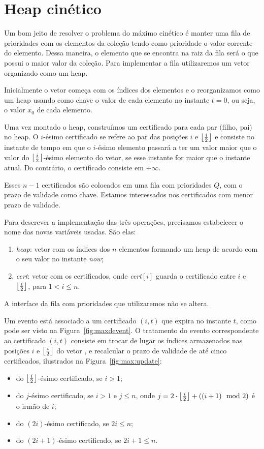 

\section{Heap cinético}\label{sec:heap-cinetico}
Um bom jeito de resolver o problema do máximo cinético é manter uma fila de
prioridades com os elementos da coleção tendo como prioridade o valor corrente
do elemento.
Dessa maneira, o elemento que se encontra na raiz da fila será o que possui o maior valor da
coleção.
Para implementar a fila utilizaremos um vetor organizado como um heap.

Inicialmente o vetor começa com os índices dos elementos e o reorganizamos como um
heap usando como chave o valor de cada elemento no instante $t = 0$, ou seja, o
valor $x_0$ de cada elemento.

Uma vez montado o heap, construímos um certificado para cada par $($filho,
pai$)$ no heap.
O $i$-ésimo certificado se refere ao par das posições $i$ e $\left\lfloor \frac{i}{2} \right\rfloor$ e consiste no
instante de tempo em que o $i$-ésimo elemento passará a ter um valor maior que o valor do
$\left\lfloor \frac{i}{2} \right\rfloor$-ésimo elemento do vetor, se esse instante for maior que o instante atual.
Do contrário, o certificado consiste em $+\infty$.

Esses $n - 1$ certificados são colocados em uma fila com prioridades $Q$, com o
prazo de validade como chave.
Estamos interessados nos certificados com menor prazo de validade.

Para descrever a implementação das três operações, precisamos estabelecer o nome
das novas variáveis usadas.
São elas:
\begin{enumerate}
    \item \textit{heap}: vetor com os índices dos $n$ elementos
    formando um heap de acordo com o seu valor no instante
    \textit{now};
    \item \textit{cert}: vetor com os certificados, onde
    \textit{cert}$[i]$ guarda o certificado entre $i$ e
    $\left\lfloor \frac{i}{2} \right\rfloor$, para $1 < i \leq n$.
\end{enumerate}

A interface da fila com prioridades que utilizaremos não se altera.

Um evento está associado a um certificado $(i, t)$ que expira no instante $t$,
como pode ser visto na Figura~\ref{fig:maxdevent}.
O tratamento do evento correspondente ao certificado $(i, t)$ consiste em trocar de lugar os
índices armazenados nas posições $i$ e $\left\lfloor \frac{i}{2} \right\rfloor$ do vetor \heap, e recalcular o prazo
de validade de até cinco certificados, ilustrados na Figura~\ref{fig:max:update}:
\begin{itemize}
    \item do $\left\lfloor \frac{i}{2} \right\rfloor$-ésimo certificado, se $i > 1$;
    \item do $j$-ésimo certificado, se $i > 1$ e $j \leq n$,
    onde $j = 2\cdot \left\lfloor \frac{i}{2} \right\rfloor + ((i + 1)\mod2)$
    é o irmão de $i$;
    \item do $(2i)$-ésimo certificado, se $2i \leq n$;
    \item do $(2i + 1)$-ésimo certificado, se $2i + 1 \leq n$.
\end{itemize}

